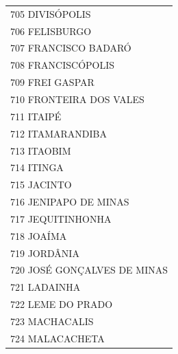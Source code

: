 \documentclass{article}
\begin{document}
\begin{longtable}[c]{m{18cm}}
\multicolumn{1}{l}{ \hspace{2em} 705 DIVISÓPOLIS } \\
\multicolumn{1}{l}{ \hspace{2em} 706 FELISBURGO } \\
\multicolumn{1}{l}{ \hspace{2em} 707 FRANCISCO BADARÓ } \\
\multicolumn{1}{l}{ \hspace{2em} 708 FRANCISCÓPOLIS } \\
\multicolumn{1}{l}{ \hspace{2em} 709 FREI GASPAR } \\
\multicolumn{1}{l}{ \hspace{2em} 710 FRONTEIRA DOS VALES } \\
\multicolumn{1}{l}{ \hspace{2em} 711 ITAIPÉ } \\
\multicolumn{1}{l}{ \hspace{2em} 712 ITAMARANDIBA } \\
\multicolumn{1}{l}{ \hspace{2em} 713 ITAOBIM } \\
\multicolumn{1}{l}{ \hspace{2em} 714 ITINGA } \\
\multicolumn{1}{l}{ \hspace{2em} 715 JACINTO } \\
\multicolumn{1}{l}{ \hspace{2em} 716 JENIPAPO DE MINAS } \\
\multicolumn{1}{l}{ \hspace{2em} 717 JEQUITINHONHA } \\
\multicolumn{1}{l}{ \hspace{2em} 718 JOAÍMA } \\
\multicolumn{1}{l}{ \hspace{2em} 719 JORDÂNIA } \\
\multicolumn{1}{l}{ \hspace{2em} 720 JOSÉ GONÇALVES DE MINAS } \\
\multicolumn{1}{l}{ \hspace{2em} 721 LADAINHA } \\
\multicolumn{1}{l}{ \hspace{2em} 722 LEME DO PRADO } \\
\multicolumn{1}{l}{ \hspace{2em} 723 MACHACALIS } \\
\multicolumn{1}{l}{ \hspace{2em} 724 MALACACHETA } \\

\end{longtable}
\end{document}
